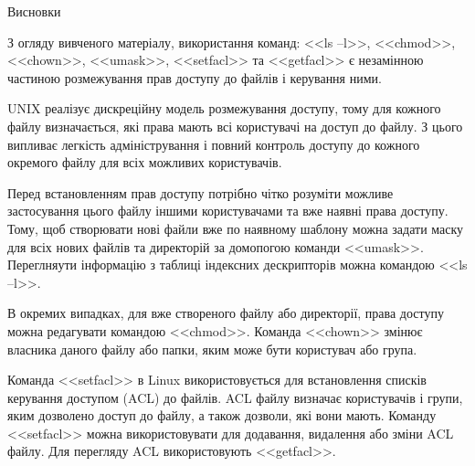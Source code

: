 \documentclass[a4paper,12pt]{article}
\begin{document}
    \begin{center}
        \Large{Висновки}
    \end{center}
    
    З огляду вивченого матеріалу, використання команд: <<ls –l>>, <<chmod>>, <<chown>>, <<umask>>, <<setfacl>> та <<getfacl>> є незамінною частиною 
    розмежування прав доступу до файлів і керування ними.

    UNIX реалізує дискреційну модель розмежування доступу, тому для кожного файлу визначається, які права мають всі користувачі на доступ до файлу.
    З цього випливає легкість адміністрування і повний контроль доступу до кожного окремого файлу для всіх можливих користувачів. 
    
    Перед встановленням прав доступу потрібно чітко розуміти можливе застосування цього файлу іншими користувачами та вже наявні права доступу.
    Тому, щоб створювати нові файли вже по наявному шаблону можна задати маску для всіх нових файлів та директорій за домопогою команди <<umask>>. 
    Переглняути інформацію з таблиці індексних дескрипторів можна командою <<ls –l>>. 

    В окремих випадках, для вже створеного файлу або директорії, права доступу можна редагувати командою <<chmod>>. 
    Команда <<chown>> змінює власника даного файлу або папки, яким може бути користувач або група. 

    Команда <<setfacl>> в Linux використовується для встановлення списків керування доступом (ACL) до файлів. 
    ACL файлу визначає користувачів і групи, яким дозволено доступ до файлу, а також дозволи, які вони мають. 
    Команду <<setfacl>> можна використовувати для додавання, видалення або зміни ACL файлу. Для перегляду ACL використовують <<getfacl>>.
\end{document}
